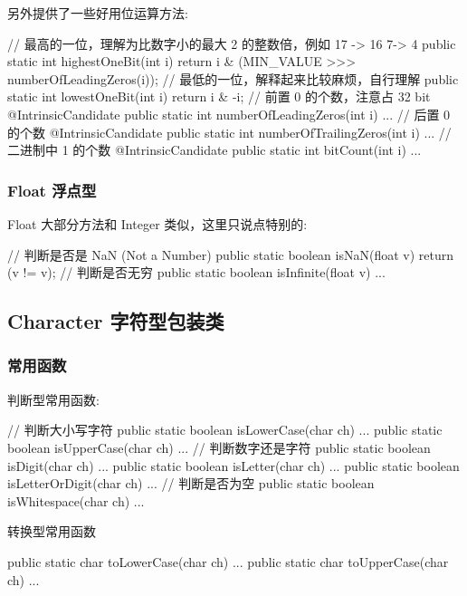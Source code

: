 另外提供了一些好用位运算方法:

\begin{Java}
// 最高的一位，理解为比数字小的最大 2 的整数倍，例如 17 -> 16  7-> 4
public static int highestOneBit(int i) {
    return i & (MIN_VALUE >>> numberOfLeadingZeros(i));
}
// 最低的一位，解释起来比较麻烦，自行理解
public static int lowestOneBit(int i) { 
    return i & -i;
}
// 前置 0 的个数，注意占 32 bit
@IntrinsicCandidate
public static int numberOfLeadingZeros(int i) { ... }
// 后置 0 的个数
@IntrinsicCandidate
public static int numberOfTrailingZeros(int i) { ... }
// 二进制中 1 的个数
@IntrinsicCandidate
public static int bitCount(int i) { ... }
\end{Java}

\subsubsection{Float 浮点型}

Float 大部分方法和 Integer 类似，这里只说点特别的:

\begin{Java}
// 判断是否是 NaN (Not a Number)
public static boolean isNaN(float v) {
    return (v != v);
}
// 判断是否无穷
public static boolean isInfinite(float v) { ... }
\end{Java}

\subsection{Character 字符型包装类}

\subsubsection{常用函数}

判断型常用函数:

\begin{Java}
// 判断大小写字符
public static boolean isLowerCase(char ch) { ... }
public static boolean isUpperCase(char ch) { ... }
// 判断数字还是字符
public static boolean isDigit(char ch) { ... }
public static boolean isLetter(char ch) { ... }
public static boolean isLetterOrDigit(char ch) { ... }
// 判断是否为空
public static boolean isWhitespace(char ch) { ... }
\end{Java}

转换型常用函数

\begin{Java}
public static char toLowerCase(char ch) { ... }
public static char toUpperCase(char ch) { ... }
\end{Java}

